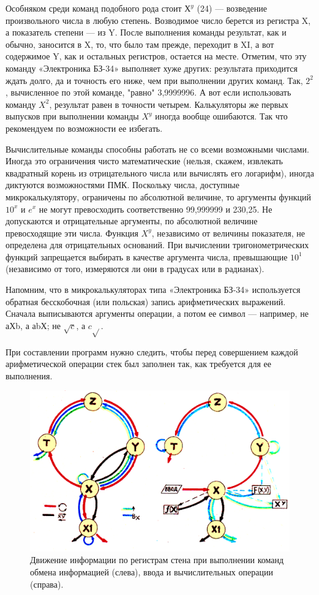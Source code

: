 \documentclass[11pt,a4paper,oneside]{article}
\begin{document}
Особняком среди команд подобного рода стоит $Х^{y}$ (24) — возведение произвольного числа в любую степень. Возводимое число берется из регистра X, а показатель степени — из Y. После выполнения команды результат, как и обычно, заносится в X, то, что было там прежде, переходит в XI, а вот содержимое Y, как и остальных регистров, остается на месте. Отметим, что эту команду «Электроника БЗ-34» выполняет хуже других: результата приходится ждать долго, да и точность его ниже, чем при выполнении других команд. Так, $2^{2}$, вычисленное по этой команде, "равно" 3,9999996. А вот если использовать команду $X^{2}$, результат равен в точности четырем. Калькуляторы же первых выпусков при выполнении команды $X^{y}$ иногда вообще ошибаются. Так что рекомендуем по возможности ее избегать.

Вычислительные команды способны работать не со всеми возможными числами. Иногда это ограничения чисто математические (нельзя, скажем, извлекать квадратный корень из отрицательного числа или вычислять его логарифм), иногда диктуются возможностями ПМК. Поскольку числа, доступные микрокалькулятору, ограничены по абсолютной величине, то аргументы функций $10^{x}$ и $e^{x}$ не могут превосходить соответственно 99,999999 и 230,25. Не допускаются и отрицательные аргументы, по абсолютной величине превосходящие эти числа. Функция $X^{y}$, независимо от величины показателя, не определена для отрицательных оснований. При вычислении тригонометрических функций запрещается выбирать в качестве аргумента числа, превышающие $10^{1}$ (независимо от того, измеряются ли они в градусах или в радианах).

Напомним, что в микрокалькуляторах типа «Электроника БЗ-34» используется обратная бесскобочная (или польская) запись арифметических выражений. Сначала выписываются аргументы операции, а потом ее символ — например, не аХb, а аbХ; не $\sqrt{c}$, а $c\sqrt{}$.

При составлении программ нужно следить, чтобы перед совершением каждой арифметической операции стек был заполнен так, как требуется для ее выполнения.

\begin{figure}[h]
\includegraphics[width=\textwidth]{stack}
\caption{Движение информации по регистрам стена при выполнении команд обмена информацией (слева), ввода и вычислительных операции (справа).}
\end{figure}
\end{document}
